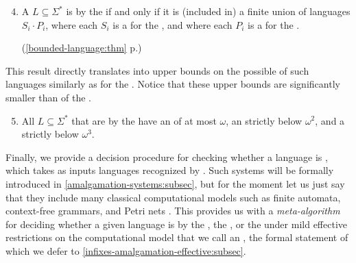 {
\renewcommand{\labelenumi}{R\arabic{enumi}}
\begin{enumerate}
	\setcounter{enumi}{3}
    \item A  $L \subseteq \Sigma^*$ is  by the  if and only if it is (included in) a finite union of languages $S_i \cdot P_i$, where each $S_i$ 
        is a  for the ,
        and where
        each $P_i$ is a  for the .

        \hfill
        (\cref{bounded-language:thm} p.\pageref{bounded-language:thm})
\end{enumerate}
}

This result directly translates into upper bounds on the possible 
of such languages similarly as for the . Notice that these
upper bounds are significantly smaller than  of the .
{
\renewcommand{\labelenumi}{R\arabic{enumi}}
\begin{enumerate}
    \setcounter{enumi}{4}
    \item All 
            $L \subseteq \Sigma^*$ that are  by the 
            have an  of at most $\omega$,
            an  strictly below $\omega^2$, and
            a  strictly below $\omega^3$.
\end{enumerate}
}

\AP Finally, we provide a decision procedure for checking whether a language is
, which takes as inputs languages recognized by
 \cite{ASZZ24}. Such systems will be formally
introduced in
\cref{amalgamation-systems:subsec}, but
for the moment let us just say that they include many classical computational
models such as finite automata, context-free grammars, and Petri nets
\cite{ASZZ24}. This provides us with a \emph{meta-algorithm} for deciding
whether a given language is  by the , the , or the  under mild
effective restrictions on the computational model that we call an , the formal statement of which we defer to
\cref{infixes-amalgamation-effective:subsec}.

